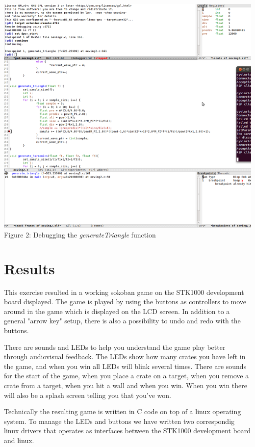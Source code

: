 \documentclass[a4paper,11pt]{article}
\begin{document}
\begin{center}

\includegraphics{images/debugsmall.png}
Figure 2: Debugging the \emph{generateTriangle} function
\end{center}

\section{Results}
This exercise resulted in a working sokoban game on the STK1000 development board displayed. The game is played by using the buttons as controllers to move around in the game which is displayed on the LCD screen. In addition to a general "arrow key" setup, there is also a possibility to undo and redo with the buttons. 

There are sounds and LEDs to help you understand the game play better through audiovisual feedback. The LEDs show how many crates you have left in the game, and when you win all LEDs will blink several times. There are sounds for the start of the game, when you place a crate on a target, when you remove a crate from a target, when you hit a wall and when you win. When you win there will also be a splash screen telling you that you've won. 

Technically the resulting game is written in C code on top of a linux operating system. To manage the LEDs and buttons we have written two correspondig linux drivers that operates as interfaces between the STK1000 development board and linux. 
\end{document}

